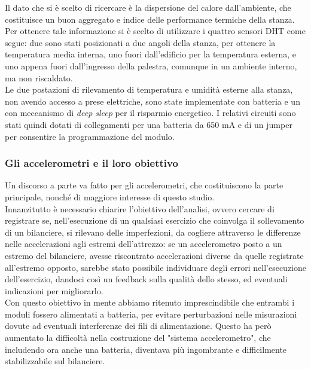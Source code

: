 \documentclass[fleqn,10pt]{SelfArx} %
\begin{document}
Il dato che si è scelto di ricercare è la dispersione del calore dall'ambiente, che costituisce un buon aggregato e 
indice delle performance termiche della stanza.\\
Per ottenere tale informazione si è scelto di utilizzare i quattro sensori DHT come segue: due sono stati 
posizionati a due angoli della stanza, per ottenere la temperatura media interna, uno fuori dall'edificio per la 
temperatura esterna, e uno appena fuori dall'ingresso della palestra, comunque in un ambiente interno, ma non riscaldato.
\\
Le due postazioni di rilevamento di temperatura e umidità esterne alla stanza, non avendo accesso a prese elettriche, 
sono state implementate con batteria e un con meccanismo di \textit{deep sleep} per il risparmio energetico. 
I relativi circuiti sono stati quindi dotati di collegamenti per una batteria da 650 mA e di un jumper per consentire la 
programmazione del modulo.

\subsubsection{Gli accelerometri e il loro obiettivo}

Un discorso a parte va fatto per gli accelerometri, che costituiscono la parte principale, nonché di maggiore interesse 
di questo studio.\\
Innanzitutto è necessario chiarire l'obiettivo dell'analisi, ovvero cercare di registrare 
se, nell'esecuzione di un qualsiasi esercizio che coinvolga il sollevamento di un bilanciere, si rilevano delle 
imperfezioni, da cogliere attraverso le differenze nelle accelerazioni agli estremi dell'attrezzo: se un accelerometro 
posto a un estremo del bilanciere, avesse riscontrato accelerazioni diverse da quelle registrate 
all'estremo opposto, sarebbe stato possibile individuare degli errori nell'esecuzione dell'esercizio, 
dandoci così un feedback sulla qualità dello stesso, ed eventuali indicazioni per migliorarlo.\\

Con questo obiettivo in mente abbiamo ritenuto imprescindibile che entrambi i moduli fossero alimentati a batteria, 
per evitare perturbazioni nelle misurazioni dovute ad eventuali interferenze dei fili di alimentazione. Questo ha però 
aumentato la difficoltà nella costruzione del "sistema accelerometro", che includendo ora anche una batteria, 
diventava più ingombrante e difficilmente stabilizzabile sul bilanciere.\\
\end{document}
